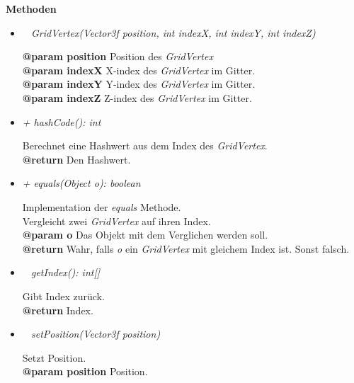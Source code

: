         \textbf{Methoden}	
        \begin{itemize}
            \item  \textit{~ GridVertex(Vector3f position, int indexX, int indexY, int indexZ)}
                \begin{leftbar}[0.9\linewidth]
                    \textbf{@param position} Position des \textit{GridVertex}\\
                    \textbf{@param indexX} X-index des \textit{GridVertex} im Gitter.\\
                    \textbf{@param indexY} Y-index des \textit{GridVertex} im Gitter.\\
                    \textbf{@param indexZ} Z-index des \textit{GridVertex} im Gitter.
                \end{leftbar}

            \item  \textit{+ hashCode(): int}
                \begin{leftbar}[0.9\linewidth]
                    Berechnet eine Hashwert aus dem Index des \textit{GridVertex}.\\
                    \textbf{@return} Den Hashwert.
                \end{leftbar}
            \pagebreak
            \item  \textit{+ equals(Object o): boolean}
                \begin{leftbar}[0.9\linewidth]
                    Implementation der \textit{equals} Methode.\\
                    Vergleicht zwei \textit{GridVertex} auf ihren Index.\\
                    \textbf{@param o} Das Objekt mit dem Verglichen werden soll.\\
                    \textbf{@return} Wahr, falls \textit{o} ein \textit{GridVertex} mit gleichem Index ist. Sonst falsch.
                \end{leftbar}

            \item  \textit{~ getIndex(): int[]}
                \begin{leftbar}[0.9\linewidth]
                    Gibt Index zurück.\\
                    \textbf{@return} Index.
                \end{leftbar}
            
            \item  \textit{~ setPosition(Vector3f position)}
                \begin{leftbar}[0.9\linewidth]
                    Setzt Position.\\
                    \textbf{@param position} Position.
                \end{leftbar}
            

\end{itemize}
